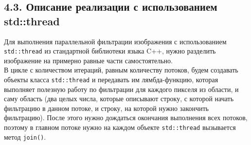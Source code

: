 \documentclass{report}
\begin{document}
    \subsection*{4.3. Описание реализации с использованием std::thread}
    \par Для выполнения параллельной фильтрации изображения с использованием \verb|std::thread| из стандартной библиотеки языка C++, нужно разделить изображение на примерно равные части самостоятельно. \\
    В цикле с количеством итераций, равным количеству потоков, будем создавать объекты класса \verb|std::thread| и передавать им лямбда-функцию, которая выполняет полезную работу по фильтрации для каждого пикселя из области, и саму область (два целых числа, которые описывают строку, с которой начать фильтрацию в данном потоке, и строку, на которой нужно закончить фильтрацию).
    После этого нужно дождаться окончания выполнения всех потоков, поэтому в главном потоке нужно на каждом объекте \verb|std::thread| вызывается метод \verb|join()|.


    \newpage
\end{document}
